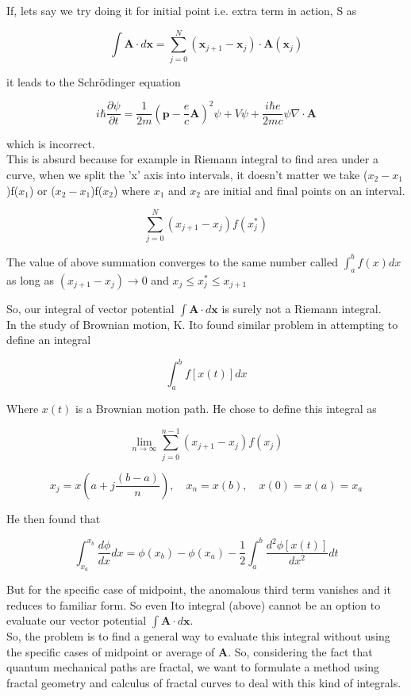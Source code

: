 \documentclass[14pt]{extarticle}
\begin{document}
If, lets say we try doing it for initial point i.e. extra term in action, S as

$$\int \textbf{A} \cdot d\textbf{x} = \sum_{j=0}^N (\textbf{x}_{j+1} -\textbf{x}_j) \cdot \textbf{A}(\textbf{x}_j)$$

it leads to the Schrödinger equation

$$i \hbar \frac{\partial \psi}{\partial t} =\frac{1}{2m} \left( \textbf{p}- \frac{e}{c} \textbf{A} \right)^2  \psi + V \psi + \frac{i \hbar e}{2mc} \psi \nabla \cdot \textbf{A} $$

which is  incorrect.\\

This is absurd because for example in Riemann integral to find area under a curve, when we split the 'x' axis into intervals, it doesn't matter we take ($x_2-x_1$)f($x_1$) or ($x_2-x_1$)f($x_2$) where $x_1$ and $x_2$ are initial and final points on an interval.

$$\sum_{j=0}^N (x_{j+1}-x_j)f(x_j^{\ast})$$


The value of above summation converges to the same number called $\int_a^b f(x)dx$ as long as $(x_{j+1}-x_j) \rightarrow 0$ and $x_j \leq x_j^{\ast} \leq x_{j+1} $

So, our integral of vector potential $\int \textbf{A} \cdot d\textbf{x}$ is surely not a Riemann integral.\\

In the study of Brownian motion, K. Ito found similar problem in attempting to define an integral

$$\int_a^b f[x(t)] dx$$

Where $x(t)$ is a Brownian motion path. He chose to define this integral as

$$\lim_{n \rightarrow \infty} \sum_{j=0}^{n-1} (x_{j+1}-x_j) f(x_j)$$

$$x_j= x \left( a+j \frac{(b-a)}{n} \right) , \quad x_n=x(b), \quad x(0)=x(a)=x_a$$

He then found that

$$\int_{x_a}^{x_b} \frac{d\phi}{dx} dx =\phi(x_b) - \phi (x_a) - \frac{1}{2} \int_a^b \frac{d^2\phi[x(t)]}{dx^2} dt$$

But for the specific case of midpoint, the anomalous third term vanishes and it reduces to familiar form. So even Ito integral (above) cannot be an option to evaluate our vector potential $\int \textbf{A} \cdot d\textbf{x} $.\\

So, the problem is to find a general way to evaluate this integral without using the specific cases of midpoint or average of $\textbf{A}$. So, considering the fact that quantum mechanical paths are fractal, we want to formulate a method using fractal geometry and calculus of fractal curves to deal with this kind of integrals.
\end{document}
